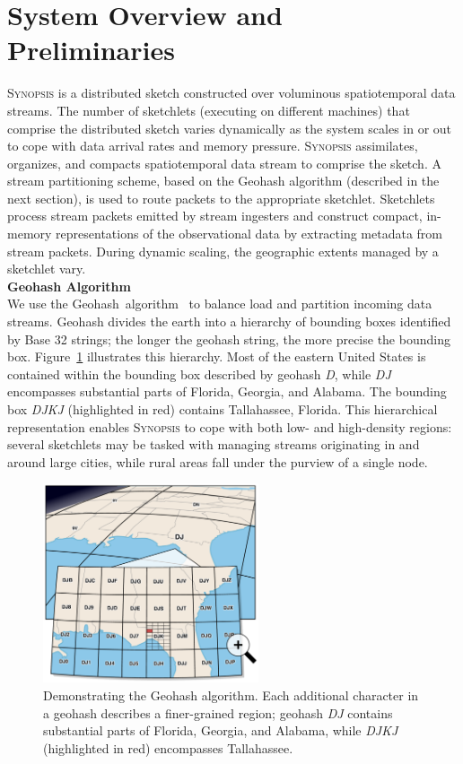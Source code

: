 \section{System Overview and Preliminaries}
\label{sec:system}
\textsc{Synopsis} is a distributed sketch constructed over voluminous spatiotemporal data streams.
The number of sketchlets (executing on different machines) that comprise the distributed sketch varies dynamically as the system scales in or out to cope with data arrival rates and memory pressure.
\textsc{Synopsis} assimilates, organizes, and compacts spatiotemporal data stream to comprise the sketch.
A stream partitioning scheme, based on the Geohash algorithm (described in the next section), is used to route packets to the appropriate sketchlet.
Sketchlets process stream packets emitted by stream ingesters and construct compact, in-memory representations of the observational data by extracting metadata from stream packets.
During dynamic scaling, the geographic extents managed by a sketchlet vary.
\vspace{1em} \\
\textbf{Geohash Algorithm} \\
We use the Geohash~algorithm~\cite{geohash} to balance load and partition incoming data streams. Geohash divides the earth into a hierarchy of bounding boxes identified by Base 32 strings; the longer the geohash string, the more precise the bounding box. Figure~\ref{fig:geohash} illustrates this hierarchy. Most of the eastern United States is contained within the bounding box described by geohash \emph{D}, while \emph{DJ} encompasses substantial parts of Florida, Georgia, and Alabama. The bounding box \emph{DJKJ} (highlighted in red) contains Tallahassee, Florida. This hierarchical representation enables \textsc{Synopsis} to cope with both low- and high-density regions: several sketchlets may be tasked with managing streams originating in and around large cities, while rural areas fall under the purview of a single node.

\begin{figure}[b!]
    \centerline{\includegraphics[width=2.5in]{figures/geohash.pdf}}
    \caption{Demonstrating the Geohash algorithm. Each additional character in a geohash describes a finer-grained region; geohash \emph{DJ} contains substantial parts of Florida, Georgia, and Alabama, while \emph{DJKJ} (highlighted in red) encompasses Tallahassee.}
    \label{fig:geohash}
\end{figure}


